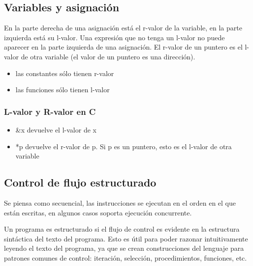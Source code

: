 \documentclass[10pt,a4paper]{report}
\begin{document}
        \subsection{Variables y asignación}
            \par En la parte derecha de una asignación está el r-valor de la variable, en la parte izquierda está su l-valor. 
                Una expresión que no tenga un l-valor no puede aparecer en la parte izquierda de una asignación. El r-valor de 
                un puntero es el l-valor de otra variable (el valor de un puntero es una dirección).
                
                \begin{itemize}
                    \item las constantes sólo tienen r-valor
                    \item las funciones sólo tienen l-valor
                \end{itemize}

            \subsubsection{L-valor y R-valor en C}
                \begin{itemize}
                    \item \&x devuelve el l-valor de x 
                    \item *p devuelve el r-valor de p. Si p es un puntero, esto es el l-valor de otra variable
                \end{itemize}

        \subsection{Control de flujo estructurado}

            \par Se piensa como secuencial, las instrucciones se ejecutan en el orden en el que están escritas, en algunos
                casos soporta ejecución concurrente. \par Un programa es estructurado si el flujo de control es evidente en la 
                estructura sintáctica del texto del programa. Esto es     útil para poder razonar intuitivamente leyendo el 
                texto del programa, ya que se crean construcciones del lenguaje para patrones comunes de control: iteración, 
                selección, procedimientos, funciones, etc.
\end{document}
